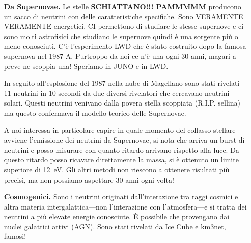 \begin{enumerate}
                Vedere gli schemini, il Borexino ha dato misure precisissime sulla catena pp ma anche per i decadimenti di Berillio e altre reazioni e decadimenti.
                
                Che problemi abbiamo coi neutrini solari? Il Sole produce un flusso di \SI{6e+10}{\per\second\per\centi\meter\squared} neutrini, veramente tanti! Questo flusso è stato misurato in diversi contesti e con diversi energie, e tutti gli esperimenti misuravano più o meno la metà dei neutrini attesi. Stiamo parlando degli anni 60, ci sono voluti 40 anni per scoprire che erano le oscillazioni. Il modello solare di bacoll è confermato!
                
                \item[\textbf{Da Supernovae.}] Le stelle \textbf{SCHIATTANO!!! PAMMMMM} producono un sacco di neutrini con delle caratteristiche specifiche. Sono VERAMENTE VERAMENTE energetici. CI permettono di studiare le stesse supernove e ci sono molti astrofisici che studiano le supernove quindi è una sorgente più o meno conosciuti. C'è l'esperimento LWD che è stato costruito dopo la famosa supernova nel 1987-A. Purtroppo da noi ce n'è una ogni 30 anni, magari a preve ne scoppia una! Speriamo in JUNO e in LWD.
                
                In seguito all'esplosione del 1987 nella nube di Magellano sono stati  rivelati 11 neutrini in 10 secondi da due diversi rivelatori che cercavano neutrini solari. Questi neutrini venivano dalla povera stella scoppiata (R.I.P. sellina) ma questo confermava il modello teorico delle Supernovae.

                A noi interessa in particolare capire in quale momento del collasso stellare avviene l'emissione dei neutrini da Supernovae, si nota che arriva un burst di neutrini e posso misurare con quanto ritardo arrivano rispetto alla luce. Da questo ritardo posso ricavare direttamente la massa, si è ottenuto un limite superiore di \SI{12}{\eV}. Gli altri metodi non riescono a ottenere risultati più precisi, ma non possiamo aspettare 30 anni ogni volta!

                \item[\textbf{Cosmogenici.}] Sono i neutrini originati dall'interazione tra raggi cosmici e altra materia intergalattica---non l'interazione con l'atmosfera---e si tratta dei neutrini a più elevate energie conosciute. È possibile che provengano dai nuclei galattici attivi (AGN). Sono stati rivelati da Ice Cube e km3net, famosi!
                

\end{enumerate}
